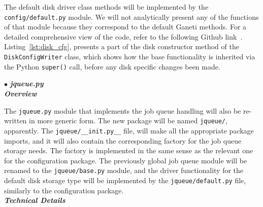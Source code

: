 \begin{description}

    \bigskip
    The default disk driver class methods will be implemented by the
    \texttt{config/default.py} module. We will not analytically present any of
    the functions of that module because they correspond to the default Ganeti
    methods. For a detailed comprehensive view of the code, refer to the
    following Github link~.
    Listing~\ref{lst:disk_cfg}, presents a part of the disk constructor method
    of the \texttt{DiskConfigWriter} class, which shows how the base
    functionality is inherited via the Python \texttt{super()} call, before any
    disk specific changes been made.

    \newpage

    \smallskip
    $\bullet$ \emph{\textbf{{\Large{jqueue.py}}}} \\

    \emph{\textbf{Overview}}

    The \texttt{jqueue.py} module that implements the job queue handling will
    also be re-written in more generic form. The new package will be named
    \texttt{jqueue/}, apparently. The \texttt{jqueue/\_\_init.py\_\_} file,
    will make all the appropriate package imports, and it will also contain
    the corresponding factory for the job queue storage needs. The factory is
    implemented in the same sense as the relevant one for the configuration
    package. The previously global job queue module will be renamed to the
    \texttt{jqueue/base.py} module, and the driver functionality for the default
    disk storage type will be implemented by the \texttt{jqueue/default.py}
    file, similarly to the configuration package.\\

    \emph{\textbf{Technical Details}}


\end{description}
